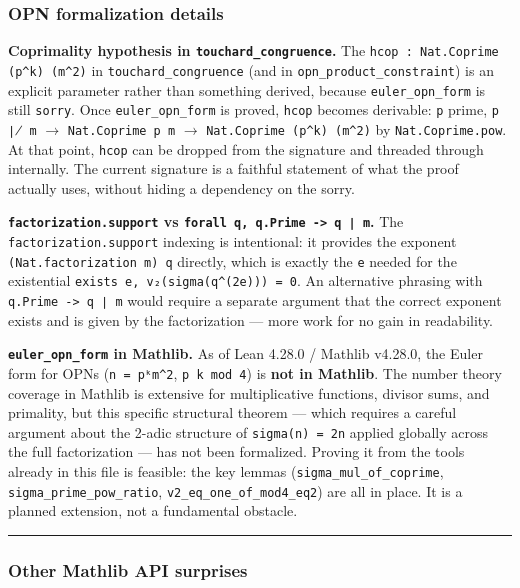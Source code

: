 \documentclass[11pt,a4paper]{article}
\begin{document}
\subsubsection{OPN formalization details}

\textbf{Coprimality hypothesis in \texttt{touchard\_congruence}.} The \texttt{hcop : Nat.Coprime (p\^{}k) (m\^{}2)} in
\texttt{touchard\_congruence} (and in \texttt{opn\_product\_constraint}) is an explicit parameter rather than
something derived, because \texttt{euler\_opn\_form} is still \texttt{sorry}. Once \texttt{euler\_opn\_form} is proved,
\texttt{hcop} becomes derivable: \texttt{p} prime, \texttt{p ∤ m} $\rightarrow$ \texttt{Nat.Coprime p m} $\rightarrow$
\texttt{Nat.Coprime (p\^{}k) (m\^{}2)} by \texttt{Nat.Coprime.pow}. At that point, \texttt{hcop} can be dropped from the
signature and threaded through internally. The current signature is a faithful statement of what
the proof actually uses, without hiding a dependency on the sorry.

\textbf{\texttt{factorization.support} vs \texttt{forall q, q.Prime -\textgreater{} q ∣ m}.} The \texttt{factorization.support} indexing is
intentional: it provides the exponent \texttt{(Nat.factorization m) q} directly, which is exactly the
\texttt{e} needed for the existential \texttt{exists e, v₂(sigma(q\^{}(2e))) = 0}. An alternative phrasing with
\texttt{q.Prime -\textgreater{} q ∣ m} would require a separate argument that the correct exponent exists and is
given by the factorization --- more work for no gain in readability.

\textbf{\texttt{euler\_opn\_form} in Mathlib.} As of Lean 4.28.0 / Mathlib v4.28.0, the Euler form for OPNs
(\texttt{n = pᵏm\^{}2}, \texttt{p \equiv k  mod 4}) is \textbf{not in Mathlib}. The number theory coverage in Mathlib
is extensive for multiplicative functions, divisor sums, and primality, but this specific
structural theorem --- which requires a careful argument about the 2-adic structure of \texttt{sigma(n) = 2n}
applied globally across the full factorization --- has not been formalized. Proving it from the
tools already in this file is feasible: the key lemmas (\texttt{sigma\_mul\_of\_coprime},
\texttt{sigma\_prime\_pow\_ratio}, \texttt{v2\_eq\_one\_of\_mod4\_eq2}) are all in place. It is a planned extension,
not a fundamental obstacle.

\begin{center}
\rule{0.5\textwidth}{0.4pt}
\end{center}

\subsubsection{Other Mathlib API surprises}
\end{document}
